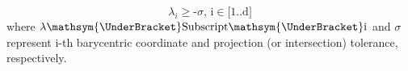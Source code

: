 \begin{equation} \label{eq:projtol}
	\lambda _i\text{$\geq $-$\sigma $, i$\in $[1..d]}
\end{equation}
where $\text{$\lambda \mathsym{\UnderBracket}$Subscript$\mathsym{\UnderBracket}$i}$ and $\sigma$ represent i-th barycentric coordinate and projection (or intersection) tolerance, respectively.